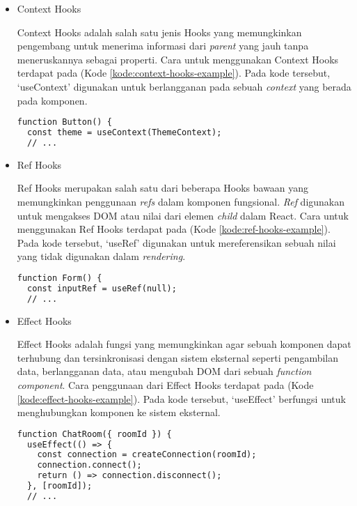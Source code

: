 \documentclass[a4paper,twoside]{article}
\begin{document}
\begin{enumerate}
\begin{itemize}
\begin{itemize}
        \item Context Hooks

        Context Hooks adalah salah satu jenis Hooks yang memungkinkan pengembang untuk menerima informasi dari \textit{parent} yang jauh tanpa meneruskannya sebagai properti. Cara untuk menggunakan Context Hooks terdapat pada (Kode \ref{kode:context-hooks-example}). Pada kode tersebut, `useContext' digunakan untuk berlangganan pada sebuah \textit{context} yang berada pada komponen.
\begin{lstlisting}[language=HTML, caption=Contoh Potongan Kode Context Hooks, label=kode:context-hooks-example]
function Button() {
  const theme = useContext(ThemeContext);
  // ...
\end{lstlisting}

        \item Ref Hooks

        Ref Hooks merupakan salah satu dari beberapa Hooks bawaan yang memungkinkan penggunaan \textit{refs} dalam komponen fungsional. \textit{Ref} digunakan untuk mengakses DOM atau nilai dari elemen \textit{child} dalam React. Cara untuk menggunakan Ref Hooks terdapat pada (Kode \ref{kode:ref-hooks-example}). Pada kode tersebut, `useRef' digunakan untuk mereferensikan sebuah nilai yang tidak digunakan dalam \textit{rendering}.
\begin{lstlisting}[language=HTML, caption=Contoh Potongan Kode Ref Hooks, label=kode:ref-hooks-example]
function Form() {
  const inputRef = useRef(null);
  // ...
\end{lstlisting}

        \item Effect Hooks

        Effect Hooks adalah fungsi yang memungkinkan agar sebuah komponen dapat terhubung dan tersinkronisasi dengan sistem eksternal seperti pengambilan data, berlangganan data, atau mengubah DOM dari sebuah \textit{function component}. Cara penggunaan dari Effect Hooks terdapat pada (Kode \ref{kode:effect-hooks-example}). Pada kode tersebut, `useEffect' berfungsi untuk menghubungkan komponen ke sistem eksternal.

\begin{lstlisting}[language=HTML, caption=Contoh Potongan Kode Effect Hooks, label=kode:effect-hooks-example]
function ChatRoom({ roomId }) {
  useEffect(() => {
    const connection = createConnection(roomId);
    connection.connect();
    return () => connection.disconnect();
  }, [roomId]);
  // ...
\end{lstlisting}


\end{itemize}
\end{itemize}
\end{enumerate}
\end{document}
